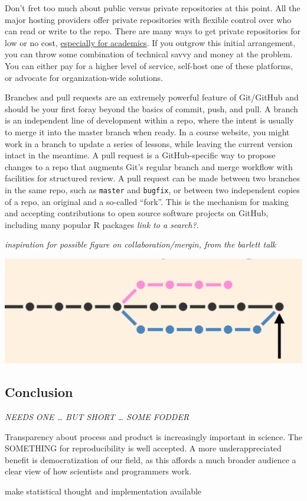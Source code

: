 \documentclass[12pt]{article}
\begin{document}
Don't fret too much about public versus private repositories at this
point. All the major hosting providers offer private repositories with
flexible control over who can read or write to the repo. There are many
ways to get private repositories for low or no cost,
\href{https://help.github.com/articles/discounted-organization-accounts/}{especially
for academics}. If you outgrow this initial arrangement, you can throw
some combination of technical savvy and money at the problem. You can
either pay for a higher level of service, self-host one of these
platforms, or advocate for organization-wide solutions.

Branches and pull requests are an extremely powerful feature of
Git/GitHub and should be your first foray beyond the basics of commit,
push, and pull. A branch is an independent line of development within a
repo, where the intent is usually to merge it into the master branch
when ready. In a course website, you might work in a branch to update a
series of lessons, while leaving the current version intact in the
meantime. A pull request is a GitHub-specific way to propose changes to
a repo that augments Git's regular branch and merge workflow with
facilities for structured review. A pull request can be made between two
branches in the same repo, such as \texttt{master} and \texttt{bugfix},
or between two independent copies of a repo, an original and a so-called
``fork''. This is the mechanism for making and accepting contributions
to open source software projects on GitHub, including many popular R
packages \emph{link to a search?}.

\emph{inspiration for possible figure on collaboration/mergin, from the
barlett talk}

\includegraphics[width=1\linewidth]{img/bartlett-merge-commit}

\subsection{Conclusion}\label{conclusion}

\emph{NEEDS ONE \ldots{} BUT SHORT \ldots{} SOME FODDER}

Transparency about process and product is increasingly important in
science. The SOMETHING for reproducibility is well accepted. A more
underappreciated benefit is democratization of our field, as this
affords a much broader audience a clear view of how scientists and
programmers work.

make statistical thought and implementation available



\end{document}
